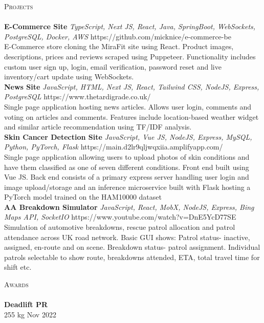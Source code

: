 \documentclass[a4paper]{article}
\newcommand{\lineunder} {
    \vspace*{-8pt} \\
    \hspace*{-18pt} \hrulefill \\
}
\newcommand{\header} [1] {
    {\hspace*{-18pt}\vspace*{6pt} \textsc{#1}}
    \vspace*{-6pt} \lineunder
}
\begin{document}
\header{Projects}
{\textbf{E-Commerce Site}} {\sl TypeScript, Next JS, React, Java, SpringBoot, WebSockets, PostgreSQL, Docker, AWS} \hfill https://github.com/micknice/e-commerce-be\\
E-Commerce store cloning the MiraFit site using React. Product images, descriptions, prices and reviews scraped using Puppeteer. Functionality includes custom user sign up, login, email verification, password reset and live inventory/cart update using WebSockets.\\
\vspace*{2mm}
{\textbf{News Site}} {\sl JavaScript, HTML, Next JS, React, Tailwind CSS, NodeJS, Express, PostgreSQL} \hfill https://www.thetardigrade.co.uk/\\
Single page application hosting news articles. Allows user login, comments and voting on articles and comments. Features include location-based weather widget and similar article recommendation using TF/IDF analysis.\\
\vspace*{2mm}
{\textbf{Skin Cancer Detection Site}} {\sl JavaScript, Vue JS, NodeJS, Express, MySQL, Python, PyTorch, Flask} \hfill https://main.d2lr9qljwqxiia.amplifyapp.com/\\
Single page application allowing users to upload photos of skin conditions and have them classified as one of seven different conditions. Front end built using Vue JS. Back end consists of a primary express server handling user login and image upload/storage and an inference microservice built with Flask hosting a PyTorch model trained on the HAM10000 dataset\\
\vspace*{2mm}
{\textbf{AA Breakdown Simulator}} {\sl JavaScript, React, MobX, NodeJS, Express, Bing Maps API, SocketIO} \hfill https://www.youtube.com/watch?v=DnE5YcD77SE\\
Simulation of automotive breakdowns, rescue patrol allocation and patrol attendance across UK road network. Basic GUI shows: Patrol status- inactive, assigned, en-route and on scene. Breakdown status- patrol assignment. Individual patrols selectable to show route, breakdowns attended, ETA, total travel time for shift etc.\\
\vspace*{2mm}

\header{Awards}
\textbf{Deadlift PR}\\
255 kg \hfill Nov 2022\\
\vspace*{2mm}
\end{document}
